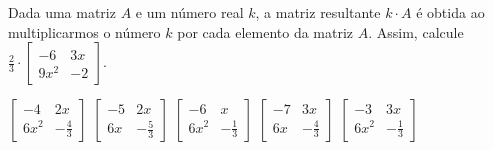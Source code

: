 Dada uma matriz $A$ e um número real $k$, a matriz resultante $k\cdot A$ é obtida ao multiplicarmos o número $k$ por cada elemento da matriz $A$. Assim, calcule $ \frac{2}{3} \cdot \left[ \begin{array}{cc}
-6 & 3x\\
9x^2 & -2
\end{array} \right]$.

$\left[ \begin{array}{cc} -4 & 2x\\ 6x^2 & -\frac{4}{3} \end{array} \right]$
$\left[ \begin{array}{cc} -5 & 2x\\ 6x & -\frac{5}{3} \end{array} \right]$
$\left[ \begin{array}{cc} -6 & x\\ 6x^2 & -\frac{1}{3} \end{array} \right]$
$\left[ \begin{array}{cc} -7 & 3x\\ 6x & -\frac{4}{3} \end{array} \right]$
$\left[ \begin{array}{cc} -3 & 3x\\ 6x^2 & -\frac{1}{3} \end{array} \right]$


